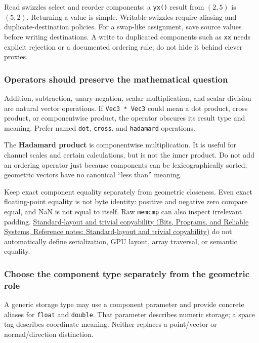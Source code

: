 Read swizzles select and reorder components: a \texttt{yx()} result from \((2,5)\) is \((5,2)\). Returning a value is simple. Writable swizzles require aliasing and duplicate-destination policies. For a swap-like assignment, save source values before writing destinations. A write to duplicated components such as \texttt{xx} needs explicit rejection or a documented ordering rule; do not hide it behind clever proxies.

\subsubsection{Operators should preserve the mathematical question}\label{02-foundations-ii-ch037-operators-should-preserve-the-mathematical-question}

Addition, subtraction, unary negation, scalar multiplication, and scalar division are natural vector operations. If \texttt{Vec3\ *\ Vec3} could mean a dot product, cross product, or componentwise product, the operator obscures its result type and meaning. Prefer named \texttt{dot}, \texttt{cross}, and \texttt{hadamard} operations.

The \textbf{Hadamard product} is componentwise multiplication. It is useful for channel scales and certain calculations, but is not the inner product. Do not add an ordering operator just because components can be lexicographically sorted; geometric vectors have no canonical ``less than'' meaning.

Keep exact component equality separately from geometric closeness. Even exact floating-point equality is not byte identity: positive and negative zero compare equal, and NaN is not equal to itself. Raw \texttt{memcmp} can also inspect irrelevant padding. \href{../01-Bits-Programs-and-Reliable-Systems/main.pdf\#nameddest=appendix-958870a64c53}{Standard-layout and trivial copyability (Bits, Programs, and Reliable Systems, Reference notes: Standard-layout and trivial copyability)} do not automatically define serialization, GPU layout, array traversal, or semantic equality.

\subsubsection{Choose the component type separately from the geometric role}\label{02-foundations-ii-ch037-choose-the-component-type-separately-from-the-geometric-role}

A generic storage type may use a component parameter and provide concrete aliases for \texttt{float} and \texttt{double}. That parameter describes numeric storage; a space tag describes coordinate meaning. Neither replaces a point/vector or normal/direction distinction.


